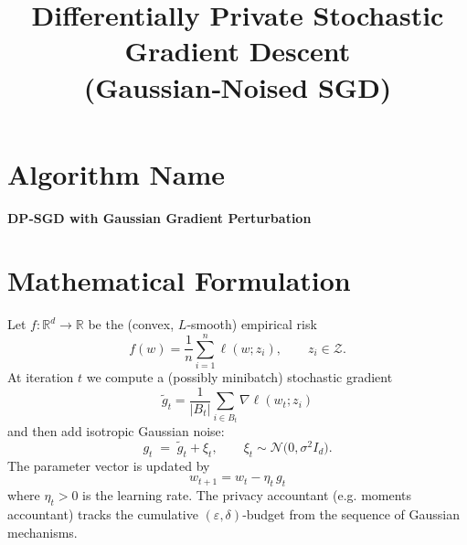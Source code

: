 \documentclass{article}
\newcommand{\R}{\mathbb{R}}
\begin{document}
\title{Differentially Private Stochastic Gradient Descent \\ (Gaussian‑Noised SGD)}
\author{}
\date{}
\maketitle

\tableofcontents
\newpage

\section*{Algorithm Name}
\begin{center}
\Large \textbf{DP‑SGD with Gaussian Gradient Perturbation}
\end{center}

\section*{Mathematical Formulation}
Let $f:\R^{d}\rightarrow\R$ be the (convex, $L$‑smooth) empirical risk
\[
f(w)=\frac{1}{n}\sum_{i=1}^{n}\ell(w;z_i),\qquad z_i\in\mathcal{Z}.
\]
At iteration $t$ we compute a (possibly minibatch) stochastic gradient
\[
\tilde g_t = \frac{1}{|B_t|}\sum_{i\in B_t}\nabla \ell(w_t;z_i)
\]
and then add isotropic Gaussian noise:
\[
g_t \;=\; \tilde g_t + \xi_t ,\qquad 
\xi_t\sim\mathcal N\!\bigl(0,\sigma^2 I_d\bigr).
\]
The parameter vector is updated by
\[
\boxed{w_{t+1}= w_t-\eta_t\, g_t }                                   \tag{1}
\]
where $\eta_t>0$ is the learning rate.  
The privacy accountant (e.g. moments accountant) tracks the cumulative
$(\varepsilon,\delta)$‑budget from the sequence of Gaussian mechanisms.

\end{document}
